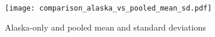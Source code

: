 \documentclass[11pt,letterpaper,oneside]{article}
\begin{document}
\begin{figure}[hbt]
	\caption{Alaska-only and pooled mean and standard deviations}
	\label{bonusfig:alaska_vs_pooled_mean_sd}
	\texttt{[image: comparison\_alaska\_vs\_pooled\_mean\_sd.pdf]}
\end{figure}


\end{document}
